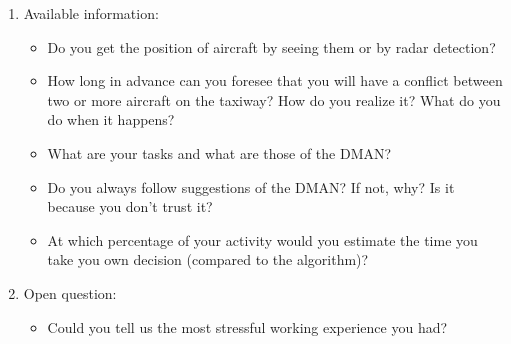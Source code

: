 \documentclass{article}
\begin{document}
\begin{enumerate}
    \item Available information:
        \begin{itemize}
            \item Do you get the position of aircraft by seeing them or by radar detection?
            \item How long in advance can you foresee that you will have a conflict between two or more aircraft on the taxiway? How do you realize it? What do you do when it happens?
            \item What are your tasks and what are those of the DMAN? 
            \item Do you always follow suggestions of the DMAN? If not, why? Is it because you don't trust it?
            \item At which percentage of your activity would you estimate the time you take you own decision (compared to the algorithm)? 
        \end{itemize}
    \item Open question:
    \begin{itemize}
        \item Could you tell us the most stressful working experience you had?
    \end{itemize}
    
\end{enumerate}
\end{document}
